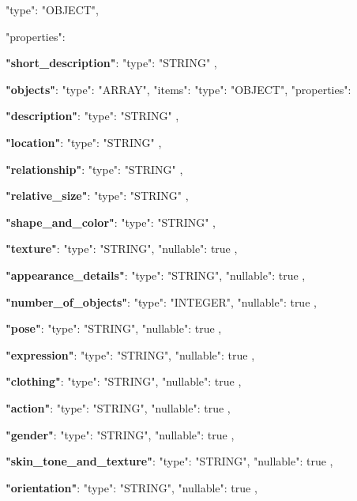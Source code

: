 \begin{table}[t]
\centering

\begin{tcolorbox}[
    colback=gray!3,
    colframe=gray!30,
    sharp corners,
    left=3pt,right=3pt,top=2pt,bottom=2pt,
    before skip=2pt, after skip=2pt,        
    fontupper=\ttfamily\scriptsize,    
]
"type": "OBJECT",

"properties": 

\quad \textbf{"short\_description"}: 
"type": "STRING"
,

\quad \textbf{"objects"}: 
"type": "ARRAY",
"items": 
"type": "OBJECT",
"properties": 

\quad \quad \textbf{"description"}: 
"type": "STRING"
,

\quad \quad \textbf{"location"}: 
"type": "STRING"
,

\quad \quad \textbf{"relationship"}: 
"type": "STRING"
,

\quad \quad \textbf{"relative\_size"}: 
"type": "STRING"
,

\quad \quad \textbf{"shape\_and\_color"}: 
"type": "STRING"
,

\quad \quad \textbf{"texture"}: 
"type": "STRING",
"nullable": true
,

\quad \quad \textbf{"appearance\_details"}: 
"type": "STRING",
"nullable": true
,

\quad \quad \textbf{"number\_of\_objects"}: 
"type": "INTEGER",
"nullable": true
,

\quad \quad \textbf{"pose"}: 
"type": "STRING",
"nullable": true
,

\quad \quad \textbf{"expression"}: 
"type": "STRING",
"nullable": true
,

\quad \quad \textbf{"clothing"}: 
"type": "STRING",
"nullable": true
,

\quad \quad \textbf{"action"}: 
"type": "STRING",
"nullable": true
,

\quad \quad \textbf{"gender"}: 
"type": "STRING",
"nullable": true
,

\quad \quad \textbf{"skin\_tone\_and\_texture"}: 
"type": "STRING",
"nullable": true
,

\quad \quad \textbf{"orientation"}: 
"type": "STRING",
"nullable": true
,


\end{tcolorbox}
\end{table}
